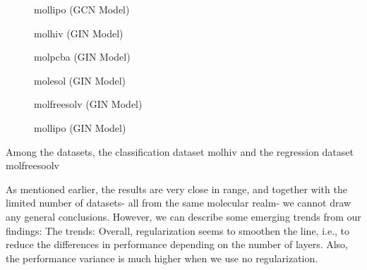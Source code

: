 \begin{figure}
    \centering
    \caption{mollipo (GCN Model)}
    \label{fig:gcn-molfreesolv}
\end{figure}

\begin{figure}
    \centering
    \caption{molhiv (GIN Model)}
    \label{fig:gcn-molfreesolv}
\end{figure}

\begin{figure}
    \centering
    \caption{molpcba (GIN Model)}
    \label{fig:gcn-molfreesolv}
\end{figure}

\begin{figure}
    \centering
    \caption{molesol (GIN Model)}
    \label{fig:gcn-molfreesolv}
\end{figure}

\begin{figure}
    \centering
    \caption{molfreesolv (GIN Model)}
    \label{fig:gcn-molfreesolv}
\end{figure}

\begin{figure}
    \centering
    \caption{mollipo (GIN Model)}
    \label{fig:gcn-molfreesolv}
\end{figure}



Among the datasets, the classification dataset molhiv and the regression dataset molfreesoolv

As mentioned earlier, the results are very close in range, and together with the limited number of datasets- all from the same molecular realm- we cannot draw any general conclusions. However, we can describe some emerging trends from our findings:
The trends:
Overall, regularization seems to smoothen the line, i.e., to reduce the differences in performance depending on the number of layers. Also, the performance variance is much higher when we use no regularization.


